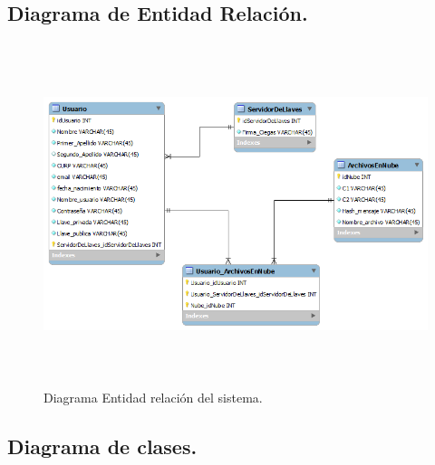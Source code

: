\subsection{Diagrama de Entidad Relación. }

\begin{figure}[H]
\centering
\includegraphics[width=16cm, height=10cm]{./images/BDTT2.png}
\caption{Diagrama Entidad relación del sistema.}

\end{figure} 

\newpage

\subsection{Diagrama de clases. }

